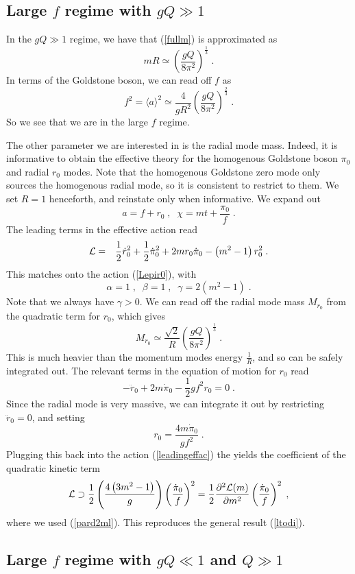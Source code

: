 \documentclass[11pt]{article}
\numberwithin{equation}{section}
\newcommand{\be}{\begin{equation}} \newcommand{\ee}{\end{equation}}
\newcommand{\bea}{\begin{eqnarray}}  \newcommand{\eea}{\end{eqnarray}}
\begin{document}
\subsection{Large $f$ regime with $gQ \gg 1$}

 In the $gQ \gg 1$ regime, we have that (\ref{fullm}) is approximated as
 \be
 m R \simeq \left(\frac{gQ}{8\pi^2}\right)^{\frac13} \;.
 \ee
In terms of the Goldstone boson, we can read off $f$ as
\be
f^2 = \langle a \rangle^2 \simeq \frac{4}{gR^2} \left(\frac{gQ}{8\pi^2}\right)^{\frac23} \;.
\ee
So we see that we are in the large $f$ regime. 

The other parameter we are interested in is the radial mode mass. Indeed, it is informative to obtain the effective theory for the homogenous Goldstone boson $\pi_0$ and radial $r_0$ modes. Note that the homogenous Goldstone zero mode only sources the homogenous radial mode, so it is consistent to restrict to them. We set $R=1$ henceforth, and reinstate only when informative. We expand out
\be
a = f + r_0 \;,\;\; \chi = m t + \frac{\pi_0}{f} \;.
\ee
The leading terms in the effective action read
\bea
{\cal L} &=& \frac{1}{2}  \dot{r}_0^2 
+ \frac{1}{2} \dot{\pi}_0^2 + 2 m  r_0  \dot{\pi}_0 - \left(m^2-1 \right) r_0^2  \;.
\label{leadingeffac}
\eea
This matches onto the action (\ref{Lepir0}), with 
\be
\alpha=1 \;,\;\;\beta = 1 \;,\;\; \gamma = 2\left(m^2-1 \right) \;.
\label{abgeff}
\ee
Note that we always have $\gamma > 0$.
We can read off the radial mode mass $M_{r_0}$ from the quadratic term for $r_0$, which gives
\be
M_{r_0} \simeq \frac{\sqrt{2}}{R} \left(\frac{gQ}{8\pi^2}\right)^{\frac13} \;.
\ee
This is much heavier than the momentum modes energy $\frac{1}{R}$, and so can be safely integrated out. 
The relevant terms in the equation of motion for $r_0$ read
\be
- \ddot{r}_0 + 2 m \dot{\pi}_0 - \frac12 g f^2 r_0 =0 \;.
\ee
Since the radial mode is very massive, we can integrate it out by restricting $\ddot{r}_0=0$, and setting
\be
r_0 = \frac{4m \dot{\pi}_0}{gf^2} \;.
\label{so2r0eq}
\ee
Plugging this back into the action (\ref{leadingeffac}) the yields the coefficient of the quadratic kinetic term
\be
{\cal L} \supset \frac12 \left(\frac{4\left(3m^2-1\right)}{g} \right)\left(\frac{\dot{\pi}_0}{f}\right)^2 = \frac12 \frac{\partial^2{\cal L}(m)}{\partial m^2}\left(\frac{\dot{\pi}_0}{f}\right)^2 \;,
\ee 
where we used (\ref{pard2ml}). This reproduces the general result (\ref{ltodi}). 

\subsection{Large $f$ regime with $gQ \ll 1$ and $Q \gg 1$}
\end{document}
